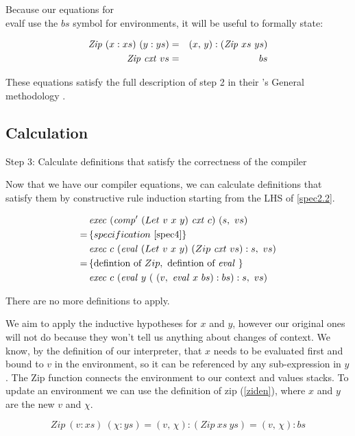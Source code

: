 \documentclass {article}
\begin{document}
Because our equations for \\evalf 
use the $bs$ symbol for environments,
it will be useful to formally state:

\newcommand{\Zip}{\mathit{Zip\ }}
\newcommand{\zip}{\textit{Zip}}

\begin{eqnarray}
\Zip (x:xs)\ (y:ys) &=& (x,\, y):(\Zip xs\ ys)  \\ \label{ziden}
\Zip \cxtm vs &=& bs \label{zcxtvs}
\end{eqnarray}
	
These equations satisfy the full description
of step 2 in their \BH's General methodology
\cite[page 42]{bandh}.


\subsection{Calculation}\label{bindcal}

Step 3: Calculate definitions that satisfy
	the correctness of the compiler

Now that we have our compiler equations,
we can calculate definitions that satisfy
them by constructive rule induction
starting from the LHS of \ref{spec2.2}\cite[pg 42]{bandh}.

\begin{align*}
	&\mathit{exec\ } (\mathit{comp'\ }  (Let\ v\ x\ y)\ \mathit{cxt\ } c)\ (s,\ vs) \\
	=\, & \{ specification\ \ref{spec4} \} \\
	&\mathit{exec\ } c\ (\mathit{eval\ }  (Let\ v\ x\ y)\ (Zip\ \mathit{cxt\ } vs):s,\ vs) \\
	=\, & \{\mbox{defintion of}\ Zip,\ \mbox{defintion of}\ \mathit{eval\ } \} \\
	&\mathit{exec\ } c\ (\mathit{eval\ }  y\ (\ (v,\ \mathit{eval\ }  x\ bs) :bs) : s,\ vs)
\end{align*}

There are no more definitions to apply.

We aim to apply the inductive 
hypotheses for $x$ and $y$,
however our original ones will 
not do because they won't tell us
anything about changes of context.
We know, by the definition of our interpreter,
that $x$ needs to be evaluated first and 
bound to $v$ in the environment, so it can be 
referenced by any sub-expression
in $y$.
The Zip function connects the environment
to our context and values stacks.
To update an environment
we can use the definition of zip (\ref{ziden}),
where $x$ and $y$ are the new $v$ and $\chi$.

\[ Zip\ (v:xs)\ (\chi:ys) 
	= (v,\, \chi):(Zip\ xs\ ys) = (v,\, \chi):bs \]
\end{document}
